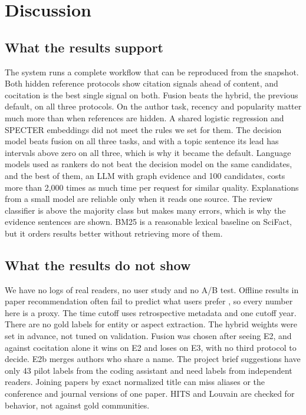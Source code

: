 \documentclass[11pt,a4paper]{article}
\begin{document}
\section{Discussion}\label{sec:discussion}
\subsection{What the results support}
The system runs a complete workflow that can be reproduced from the snapshot. Both hidden reference protocols show citation signals ahead of content, and cocitation is the best single signal on both. Fusion beats the hybrid, the previous default, on all three protocols. On the author task, recency and popularity matter much more than when references are hidden. A shared logistic regression and SPECTER embeddings did not meet the rules we set for them. The decision model beats fusion on all three tasks, and with a topic sentence its lead has intervals above zero on all three, which is why it became the default. Language models used as rankers do not beat the decision model on the same candidates, and the best of them, an LLM with graph evidence and 100 candidates, costs more than 2,000 times as much time per request for similar quality. Explanations from a small model are reliable only when it reads one source. The review classifier is above the majority class but makes many errors, which is why the evidence sentences are shown. BM25 is a reasonable lexical baseline on SciFact, but it orders results better without retrieving more of them.

\subsection{What the results do not show}
We have no logs of real readers, no user study and no A/B test. Offline results in paper recommendation often fail to predict what users prefer \citep{beel2016}, so every number here is a proxy. The time cutoff uses retrospective metadata and one cutoff year. There are no gold labels for entity or aspect extraction. The hybrid weights were set in advance, not tuned on validation. Fusion was chosen after seeing E2, and against cocitation alone it wins on E2 and loses on E3, with no third protocol to decide. E2b merges authors who share a name. The project brief suggestions have only 43 pilot labels from the coding assistant and need labels from independent readers. Joining papers by exact normalized title can miss aliases or the conference and journal versions of one paper. HITS and Louvain are checked for behavior, not against gold communities.
\end{document}
